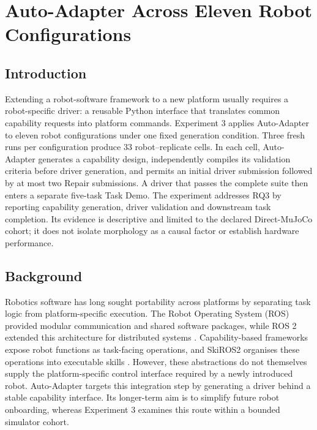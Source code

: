 \chapter[Auto-Adapter Across Robots]{Auto-Adapter Across Eleven Robot Configurations}
\label{chapter:multi-robot-experiment}

\section[Introduction]{Introduction}

Extending a robot-software framework to a new platform usually requires a
robot-specific driver: a reusable Python interface that translates common
capability requests into platform commands. Experiment 3 applies Auto-Adapter
to eleven robot configurations under one fixed generation condition. Three
fresh runs per configuration produce 33 robot--replicate cells. In each cell,
Auto-Adapter generates a capability design, independently compiles its
validation criteria before driver generation, and permits an initial driver
submission followed by at most two Repair submissions. A driver that passes
the complete suite then enters a separate five-task Task Demo. The experiment
addresses RQ3 by reporting capability generation, driver validation and
downstream task completion. Its evidence is descriptive and limited to the
declared Direct-MuJoCo cohort; it does not isolate morphology as a causal
factor or establish hardware performance.

\section[Background]{Background}

Robotics software has long sought portability across platforms by separating
task logic from platform-specific execution. The Robot Operating System (ROS)
provided modular communication and shared software packages, while ROS 2
extended this architecture for distributed systems
\citep{quigley2009ros,macenski2022ros2}. Capability-based frameworks expose
robot functions as task-facing operations, and SkiROS2 organises these
operations into executable skills
\citep{pantano2022capabilitysurvey,mayr2023skiros2}. However, these abstractions
do not themselves supply the platform-specific control interface required by a
newly introduced robot. Auto-Adapter targets this integration step by
generating a driver behind a stable capability interface. Its longer-term aim
is to simplify future robot onboarding, whereas Experiment 3 examines this
route within a bounded simulator cohort.

